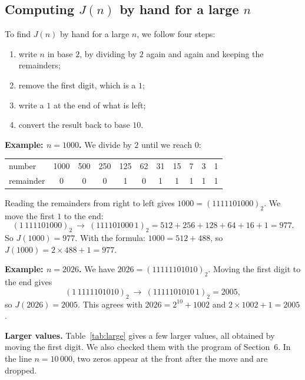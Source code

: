 \subsection{Computing \texorpdfstring{$J(n)$}{J(n)} by hand for a large \texorpdfstring{$n$}{n}}

To find $J(n)$ by hand for a large $n$, we follow four steps:
\begin{enumerate}
  \item write $n$ in base $2$, by dividing by $2$ again and again and keeping
        the remainders;
  \item remove the first digit, which is a $1$;
  \item write a $1$ at the end of what is left;
  \item convert the result back to base $10$.
\end{enumerate}

\textbf{Example: $n=1000$.} We divide by $2$ until we reach $0$:
\begin{center}
\renewcommand{\arraystretch}{1.1}
\begin{tabular}{l*{10}{c}}
number & 1000 & 500 & 250 & 125 & 62 & 31 & 15 & 7 & 3 & 1\\
remainder & 0 & 0 & 0 & 1 & 0 & 1 & 1 & 1 & 1 & 1
\end{tabular}
\end{center}
Reading the remainders from right to left gives $1000=(1111101000)_2$. We move
the first $1$ to the end:
\[
(1\,111101000)_2\ \longrightarrow\ (111101000\,1)_2=512+256+128+64+16+1=977 .
\]
So $J(1000)=977$. With the formula: $1000=512+488$, so
$J(1000)=2\times488+1=977$.

\textbf{Example: $n=2026$.} We have $2026=(11111101010)_2$. Moving the first digit to the end gives
\[
(1\,1111101010)_2\ \longrightarrow\ (1111101010\,1)_2=2005,
\]
so $J(2026)=2005$. This agrees with
$2026=2^{10}+1002$ and $2\times1002+1=2005$.

\textbf{Larger values.} Table~\ref{tab:large} gives a few larger values, all obtained by moving the
first digit. We also checked them with the program of Section~6. In the line
$n=10\,000$, two zeros appear at the front after the move and are dropped.


